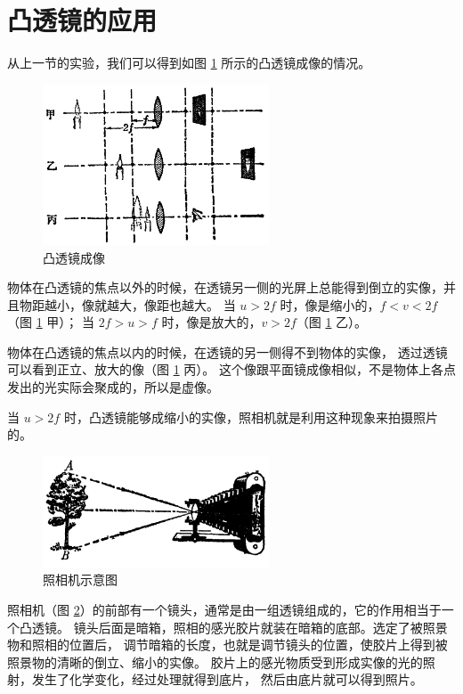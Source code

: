 \section{凸透镜的应用}\label{sec:1-8}

从上一节的实验，我们可以得到如图 \ref{fig:1-27} 所示的凸透镜成像的情况。

\begin{figure}[H]
    \centering
    \includegraphics[width=0.6\textwidth]{../pic/czwl2-ch1-27}
    \caption{凸透镜成像}\label{fig:1-27}
\end{figure}

物体在凸透镜的焦点以外的时候，在透镜另一侧的光屏上总能得到倒立的实像，并且物距越小，像就越大，像距也越大。
当 $u > 2f$ 时，像是缩小的，$f < v < 2f$ （图 \ref{fig:1-27} 甲）；
当 $2f > u > f$ 时，像是放大的，$v > 2f$（图 \ref{fig:1-27} 乙）。

物体在凸透镜的焦点以内的时候，在透镜的另一侧得不到物体的实像，
透过透镜可以看到正立、放大的像（图 \ref{fig:1-27} 丙）。
这个像跟平面镜成像相似，不是物体上各点发出的光实际会聚成的，所以是虚像。

 当 $u > 2f$ 时，凸透镜能够成缩小的实像，照相机就是利用这种现象来拍摄照片的。

\begin{figure}[htbp]
    \centering
    \includegraphics[width=0.6\textwidth]{../pic/czwl2-ch1-28}
    \caption{照相机示意图}\label{fig:1-28}
\end{figure}

照相机（图 \ref{fig:1-28}）的前部有一个镜头，通常是由一组透镜组成的，它的作用相当于一个凸透镜。
镜头后面是暗箱，照相的感光胶片就装在暗箱的底部。选定了被照景物和照相的位置后，
调节暗箱的长度，也就是调节镜头的位置，使胶片上得到被照景物的清晰的倒立、缩小的实像。
胶片上的感光物质受到形成实像的光的照射，发生了化学变化，经过处理就得到底片，
然后由底片就可以得到照片。


